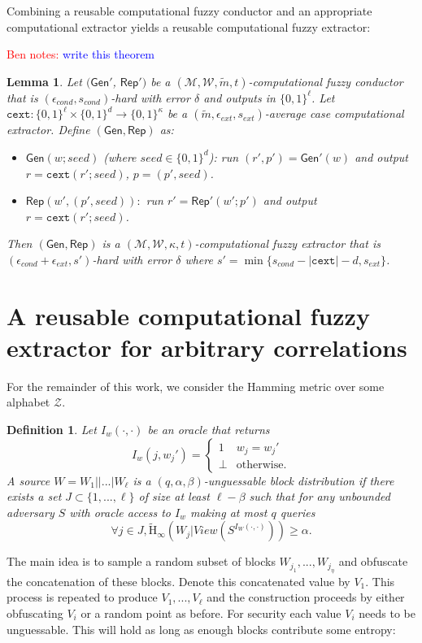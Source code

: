 \documentclass[11pt]{article}
\newcommand{\class}[1]{{\ensuremath{\mathsf{#1}}}}
\newcommand{\gen}{\ensuremath{\class{Gen}}\xspace}
\newcommand{\rep}{\ensuremath{\class{Rep}}\xspace}
\newcommand{\zo}{\ensuremath{\{0, 1\}}}
\newcommand{\Hav}{\tilde{\mathrm{H}}_\infty}
\newcommand{\cext}{\ensuremath{\mathtt{cext}}}
\newtheorem{lemma}[theorem]{Lemma}
\newtheorem{definition}[theorem]{Definition}
\newcommand{\authnote}[2]{{\textcolor{red}{\textsf{#1 notes: }\textcolor{blue}{ #2}}\marginpar{\textcolor{red}{\textbf{!!!!!}}}}}
\newcommand{\authnote}[2]{}
\newcommand{\bnote}[1]{{\authnote{Ben}{#1}}}
\begin{document}
Combining a reusable computational fuzzy conductor and an appropriate computational extractor yields a reusable computational fuzzy extractor:

\bnote{write this theorem}
\begin{lemma}
\label{lem:cond and cext}
Let $(\gen'$, $\rep')$ be a $(\mathcal{M}, \mathcal{W}, \tilde{m}, t)$-computational fuzzy conductor that is $(\epsilon_{cond}, s_{cond})$-hard with error $\delta$ and outputs in $\zo^\ell$.  Let $\cext:\zo^\ell\times \zo^d\rightarrow \zo^\kappa$ be a $(\tilde{m}, \epsilon_{ext}, s_{ext})$-average case computational extractor.  Define $(\gen, \rep)$ as:
\begin{itemize}
\item $\gen(w; seed)$ (where $seed\in \zo^d$): run $(r', p')= \gen'(w)$ and output $r = \cext(r'; seed)$, $p = (p', seed)$. 
\item $\rep(w', (p', seed)):$ run $r' = \rep'(w'; p')$ and output $r = \cext(r'; seed)$.
\end{itemize}
Then $(\gen, \rep)$ is a $(\mathcal{M}, \mathcal{W}, \kappa, t)$-computational fuzzy extractor that is $(\epsilon_{cond}+\epsilon_{ext}, s')$-hard with error $\delta$ where $s' = \min\{s_{cond} - |\cext| -d, s_{ext}\}$.
\end{lemma}


\section{A reusable computational fuzzy extractor for arbitrary correlations}
\label{sec:construction}
For the remainder of this work, we consider the Hamming metric over some alphabet $\mathcal{Z}$.  

\begin{definition}
\label{def:block guessable}
Let $I_w (\cdot, \cdot)$ be an oracle that returns \[I_w(j, w_j')=
\begin{cases}
1 & w_j = w_j'\\
\perp & \text{otherwise}.
\end{cases}
\]
A source $W = W_1||...|W_\ell$ is a $(q, \alpha, \beta)$-\emph{unguessable block distribution} if there exists a set $J\subset\{1,..., \ell\}$ of size at least $\ell -\beta$ such that for any unbounded adversary $S$ with oracle access to $I_w$ making at most $q$ queries
\[
\forall j\in J, \Hav(W_j |View(S^{I_{W}(\cdot, \cdot)}))\geq \alpha.
\]
\end{definition}

The main idea is to sample a random subset of blocks $W_{j_1},..., W_{j_\eta}$ and obfuscate the concatenation of these blocks.  Denote this concatenated value by $V_1$.  This process is repeated to produce $V_1,..., V_\ell$ and the construction proceeds by either obfuscating $V_i$ or a random point as before. For security each value $V_i$ needs to be unguessable.  This will hold as long as enough blocks contribute some entropy:
\end{document}
